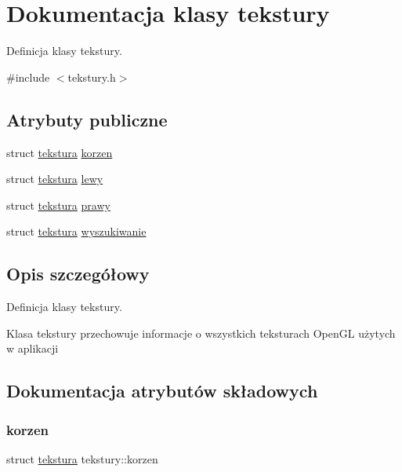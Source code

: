 \hypertarget{classtekstury}{}\section{Dokumentacja klasy tekstury}
\label{classtekstury}


Definicja klasy tekstury.  




{\ttfamily \#include $<$tekstury.\+h$>$}

\subsection*{Atrybuty publiczne}
\begin{DoxyCompactItemize}
\item 
struct \mbox{\hyperlink{classtekstura}{tekstura}} \mbox{\hyperlink{classtekstury_a8b909f3a15bdb2d1e5d70fbafe80c334}{korzen}}
\item 
struct \mbox{\hyperlink{classtekstura}{tekstura}} \mbox{\hyperlink{classtekstury_a1180f008cfa3be39070886f4cc332403}{lewy}}
\item 
struct \mbox{\hyperlink{classtekstura}{tekstura}} \mbox{\hyperlink{classtekstury_a46e17183769205f5de0b31d1c1240ada}{prawy}}
\item 
struct \mbox{\hyperlink{classtekstura}{tekstura}} \mbox{\hyperlink{classtekstury_a7a64df71fd68f590fd46a26216a23b30}{wyszukiwanie}}
\end{DoxyCompactItemize}


\subsection{Opis szczegółowy}
Definicja klasy tekstury. 

Klasa tekstury przechowuje informacje o wszystkich teksturach Open\+GL użytych w aplikacji 

\subsection{Dokumentacja atrybutów składowych}
\mbox{\label{classtekstury_a8b909f3a15bdb2d1e5d70fbafe80c334}} 
\subsubsection{\texorpdfstring{korzen}{korzen}}
{\footnotesize\ttfamily struct \mbox{\hyperlink{classtekstura}{tekstura}} tekstury\+::korzen}

